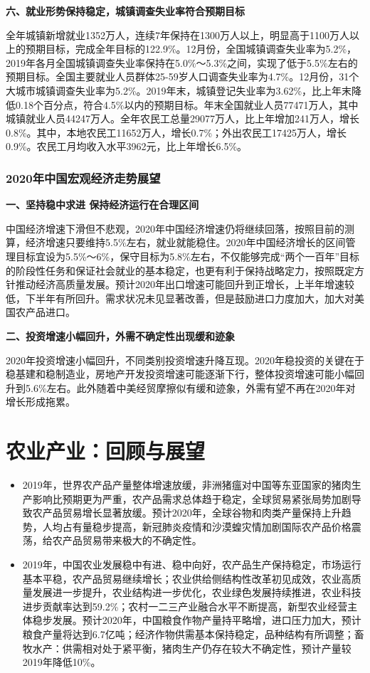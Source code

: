 \documentclass{progbookcn}
\begin{document}
\textbf{六、就业形势保持稳定，城镇调查失业率符合预期目标}

全年城镇新增就业1352万人，连续7年保持在1300万人以上，明显高于1100万人以上的预期目标，完成全年目标的122.9\%。12月份，全国城镇调查失业率为5.2\%，2019年各月全国城镇调查失业率保持在5.0\%～5.3\%之间，实现了低于5.5\%左右的预期目标。全国主要就业人员群体25-59岁人口调查失业率为4.7\%。12月份，31个大城市城镇调查失业率为5.2\%。2019年末，城镇登记失业率为3.62\%，比上年末降低0.18个百分点，符合4.5\%以内的预期目标。年末全国就业人员77471万人，其中城镇就业人员44247万人。全年农民工总量29077万人，比上年增加241万人，增长0.8\%。其中，本地农民工11652万人，增长0.7\%；外出农民工17425万人，增长0.9\%。农民工月均收入水平3962元，比上年增长6.5\%。

\subsection{2020年中国宏观经济走势展望}

\textbf{一、坚持稳中求进 保持经济运行在合理区间}

中国经济增速下滑但不悲观，2020年中国经济增速仍将继续回落，按照目前的测算，经济增速只要维持5.5\%左右，就业就能稳住。2020年中国经济增长的区间管理目标宜设为5.5\%～6\%，保守目标为5.8\%左右，不仅能够完成“两个一百年”目标的阶段性任务和保证社会就业的基本稳定，也更有利于保持战略定力，按照既定方针推动经济高质量发展。预计2020年出口增速可能回升到正增长，上半年增速较低，下半年有所回升。需求状况未见显著改善，但是鼓励进口力度加大，加大对美国农产品进口。

\textbf{二、投资增速小幅回升，外需不确定性出现缓和迹象}

2020年投资增速小幅回升，不同类别投资增速升降互现。2020年稳投资的关键在于稳基建和稳制造业，房地产开发投资增速可能逐渐下行，整体投资增速可能小幅回升到5.6\%左右。此外随着中美经贸摩擦似有缓和迹象，外需有望不再在2020年对增长形成拖累。

\chapter{农业产业：回顾与展望}
\begin{titledbox}{}
\begin{itemize}
  \item 2019年，世界农产品产量整体增速放缓，非洲猪瘟对中国等东亚国家的猪肉生产影响比预期更为严重，农产品需求总体趋于稳定，全球贸易紧张局势加剧导致农产品贸易增长显著放缓。预计2020年，全球谷物和肉类产量保持上升趋势，人均占有量稳步提高，新冠肺炎疫情和沙漠蝗灾情加剧国际农产品价格震荡，给农产品贸易带来极大的不确定性。
  \item 2019年，中国农业发展稳中有进、稳中向好，农产品生产保持稳定，市场运行基本平稳，农产品贸易继续增长；农业供给侧结构性改革初见成效，农业高质量发展进一步提升，农业结构进一步优化，农业绿色发展持续推进，农业科技进步贡献率达到59.2\%；农村一二三产业融合水平不断提高，新型农业经营主体稳步发展。预计2020年，中国粮食作物产量持平略增，进口压力加大，预计粮食产量将达到6.7亿吨；经济作物供需基本保持稳定，品种结构有所调整；畜牧水产：供需相对处于紧平衡，猪肉生产仍存在较大不确定性，预计产量较2019年降低10\%。
 \end{itemize}
\end{titledbox}
\end{document}
